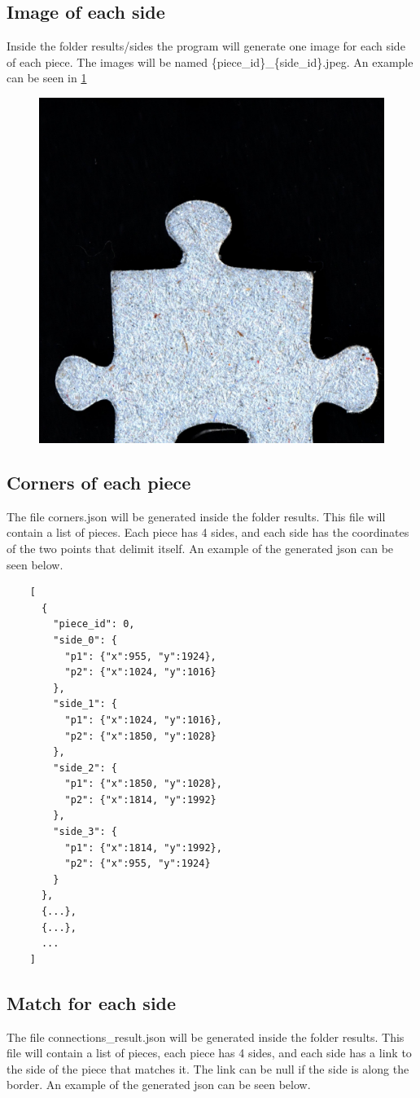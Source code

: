 \documentclass{article}
\begin{document}
\subsection{Image of each side}

Inside the folder results/sides the program will generate one image 
for each side of each piece. The images will be named \{piece\_id\}\_\{side\_id\}.jpeg.
An example can be seen in \cref{fig:result_sides}

\begin{figure}[H]
  \caption{}\label{fig:result_sides}
  \centering
  \includegraphics[height=0.3\textwidth]{pictures/result_sides.jpeg}
\end{figure}

\subsection{Corners of each piece}
The file corners.json will be generated inside the folder results.
This file will contain a list of pieces.
Each piece has 4 sides, and each side has the coordinates of the two points
that delimit itself.\newline
An example of the generated json can be seen below.


\begin{minipage}{\textwidth}
  \begin{lstlisting}
    [
      {
        "piece_id": 0,
        "side_0": {
          "p1": {"x":955, "y":1924},
          "p2": {"x":1024, "y":1016}
        },
        "side_1": {
          "p1": {"x":1024, "y":1016},
          "p2": {"x":1850, "y":1028}
        },
        "side_2": {
          "p1": {"x":1850, "y":1028},
          "p2": {"x":1814, "y":1992}
        },
        "side_3": {
          "p1": {"x":1814, "y":1992},
          "p2": {"x":955, "y":1924}
        }
      },
      {...},
      {...},
      ...
    ]
  \end{lstlisting}
\end{minipage}

\subsection{Match for each side}
The file connections\_result.json will be generated
inside the folder results. This file will contain a list of pieces,
each piece has 4 sides, and each side has a link to the side of the piece
that matches it. The link can be null if the side is along the border.\newline
An example of the generated json can be seen below.
\end{document}
